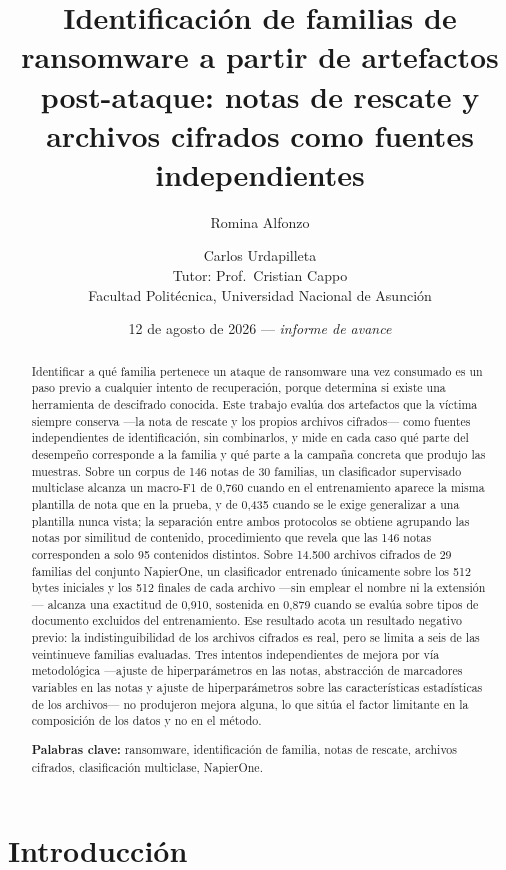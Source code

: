 \documentclass[11pt,a4paper]{article}
\title{\vspace{-1.2cm}\bfseries Identificación de familias de ransomware a partir de
artefactos post-ataque: notas de rescate y archivos cifrados como fuentes independientes}
\author{Romina Alfonzo \and Carlos Urdapilleta \\[2pt]
\small Tutor: Prof.\ Cristian Cappo \\[2pt]
\small Facultad Politécnica, Universidad Nacional de Asunción}
\date{\small 12 de agosto de 2026 --- \textit{informe de avance}}
\begin{document}
\maketitle

\begin{abstract}
\noindent Identificar a qué familia pertenece un ataque de ransomware una vez consumado es un
paso previo a cualquier intento de recuperación, porque determina si existe una herramienta de
descifrado conocida. Este trabajo evalúa dos artefactos que la víctima siempre conserva ---la
nota de rescate y los propios archivos cifrados--- como fuentes independientes de
identificación, sin combinarlos, y mide en cada caso qué parte del desempeño corresponde a la
familia y qué parte a la campaña concreta que produjo las muestras. Sobre un corpus de 146
notas de 30 familias, un clasificador supervisado multiclase alcanza un macro-F1 de 0,760
cuando en el entrenamiento aparece la misma plantilla de nota que en la prueba, y de 0,435
cuando se le exige generalizar a una plantilla nunca vista; la separación entre ambos
protocolos se obtiene agrupando las notas por similitud de contenido, procedimiento que revela
que las 146 notas corresponden a solo 95 contenidos distintos. Sobre 14.500 archivos cifrados
de 29 familias del conjunto NapierOne, un clasificador entrenado únicamente sobre los 512
bytes iniciales y los 512 finales de cada archivo ---sin emplear el nombre ni la extensión---
alcanza una exactitud de 0,910, sostenida en 0,879 cuando se evalúa sobre tipos de documento
excluidos del entrenamiento. Ese resultado acota un resultado negativo previo: la
indistinguibilidad de los archivos cifrados es real, pero se limita a seis de las
veintinueve familias evaluadas. Tres intentos independientes de mejora por vía metodológica
---ajuste de hiperparámetros en las notas, abstracción de marcadores variables en las notas y
ajuste de hiperparámetros sobre las características estadísticas de los archivos--- no
produjeron mejora alguna, lo que sitúa el factor limitante en la composición de los datos y no
en el método.

\vspace{4pt}
\noindent\textbf{Palabras clave:} ransomware, identificación de familia, notas de rescate,
archivos cifrados, clasificación multiclase, NapierOne.
\end{abstract}

\section{Introducción}
\end{document}
